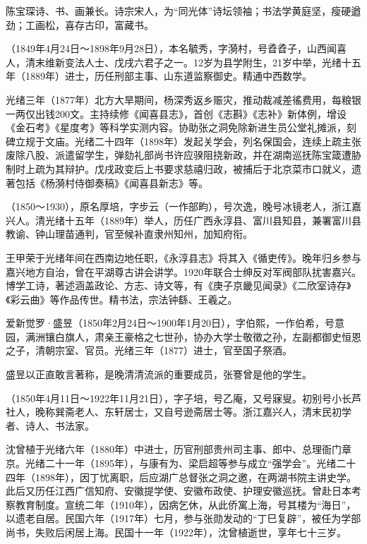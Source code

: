 \begin{description}
        陈宝琛诗、书、画兼长。诗宗宋人，为“同光体”诗坛领袖；书法学黄庭坚，瘦硬遒劲；工画松，喜存古印，富藏书。
  \item[杨深秀] （1849年4月24日～1898年9月28日），本名毓秀，字漪村，号孴孴子，山西闻喜人，清末维新变法人士、戊戌六君子之一。12岁为县学附生，21岁中举，光绪十五年（1889年）进士，历任刑部主事、山东道监察御史。精通中西数学。\par
        光绪三年（1877年）北方大旱期间，杨深秀返乡赈灾，推动裁减差徭费用，每粮银一两仅出钱200文。主持续修《闻喜县志》，首创《志斟》《志补》新体例，增设《金石考》《星度考》等科学实测内容。协助张之洞免除新进生员公堂礼摊派，刻碑立规于文庙。光绪二十四年（1898年）发起关学会，列名保国会，连续上疏主张废除八股、派遣留学生，弹劾礼部尚书许应骙阻挠新政，并在湖南巡抚陈宝箴遭胁制时上疏为其辩护。戊戌政变后上书要求慈禧归政，被捕后于北京菜市口就义，遗著包括《杨漪村侍御奏稿》《闻喜县新志》等。
  \item[王甲荣] （1850～1930），原名厚培，字步云（一作部畇），号次逸，晚号冰镜老人，浙江嘉兴人。清光绪十五年（1889年）举人，历任广西永淳县、富川县知县，兼署富川县教谕、钟山理苗通判，官至候补直隶州知州，加知府衔。\par
        王甲荣于光绪年间在西南边地任职，《永淳县志》将其入《循吏传》。晚年归乡参与嘉兴地方自治，曾在平湖尊古讲会讲学。1920年联合士绅反对军阀部队扰害嘉兴。博学工诗，著述涵盖政论、方志、诗文等，有《庚子京畿见闻录》《二欣室诗存》《彩云曲》等作品传世。精书法，宗法钟繇、王羲之。
  \item[盛昱] 爱新觉罗·盛昱（1850年2月24日～1900年1月20日），字伯熙，一作伯希，号意园，满洲镶白旗人，肃亲王豪格之七世孙，协办大学士敬徵之孙，左副都御史恒恩之子，清朝宗室、官员。光绪三年（1877）进士，官至国子祭酒。\par
        盛昱以正直敢言著称，是晚清清流派的重要成员，张謇曾是他的学生。
  \item[沈增植] （1850年4月11日～1922年11月21日），字子培，号乙庵，又号寐叟。初别号小长芦社人，晚称巽斋老人、东轩居士，又自号逊斋居士等。浙江嘉兴人，清末民初学者、诗人、书法家。\par
        沈曾植于光绪六年（1880年）中进士，历官刑部贵州司主事、郎中、总理衙门章京。光绪二十一年（1895年），与康有为、梁启超等参与成立“强学会”。光绪二十四年（1898年），因丁忧离职，后应湖广总督张之洞之邀，在两湖书院主讲史学。此后又历任江西广信知府、安徽提学使、安徽布政使、护理安徽巡抚。曾赴日本考察教育制度。宣统二年（1910年），因病乞休，从此侨寓上海，号其楼为“海日”，以遗老自居。民国六年（1917年）七月，参与张勋发动的“丁巳复辟”，被任为学部尚书，失败后闲居上海。民国十一年（1922年），沈曾植逝世，享年七十三岁。\par

\end{description}
